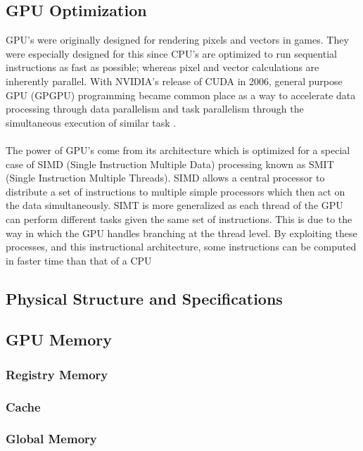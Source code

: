 \subsection{GPU Optimization}\label{gpu}
GPU's were originally designed for rendering pixels and vectors in games. They were especially designed for this since CPU's are optimized to run sequential instructions as fast as possible; whereas pixel and vector calculations are inherently parallel. With NVIDIA's release of CUDA in 2006, general purpose GPU (GPGPU) programming became common place as a way to accelerate data processing through data parallelism and task parallelism through the simultaneous execution of similar task \cite{nvidia_cuda}.
\\
\\
The power of GPU's come from its architecture which is optimized for a special case of SIMD (Single Instruction Multiple Data) processing known as SMIT (Single Instruction Multiple Threads). SIMD allows a central processor to distribute a set of instructions to multiple simple processors which then act on the data simultaneously. SIMT is more generalized as each thread of the GPU can perform different tasks given the same set of instructions. This is due to the way in which the GPU handles branching at the thread level. By exploiting these processes, and this instructional architecture, some instructions can be computed in faster time than that of a CPU \cite{vuduc2013brief}
\subsection{Physical Structure and Specifications}\label{gpu:sec:str}
\subsection{GPU Memory}\label{gpu:sec:mem}
%
\subsubsection{Registry Memory}\label{gpu:ssec:reg}
%
\subsubsection{Cache}\label{gpu:ssec:cache}
%
\subsubsection{Global Memory}\label{gpu:ssec:gm}
%
